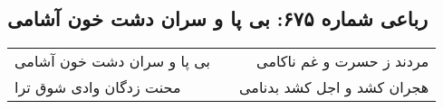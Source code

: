 \begin{center}
\section*{رباعی شماره ۶۷۵: بی پا و سران دشت خون آشامی}
\label{sec:sh675}
\begin{longtable}{l p{0.5cm} r}
بی پا و سران دشت خون آشامی
&&
مردند ز حسرت و غم ناکامی
\\
محنت زدگان وادی شوق ترا
&&
هجران کشد و اجل کشد بدنامی
\\
\end{longtable}
\end{center}
